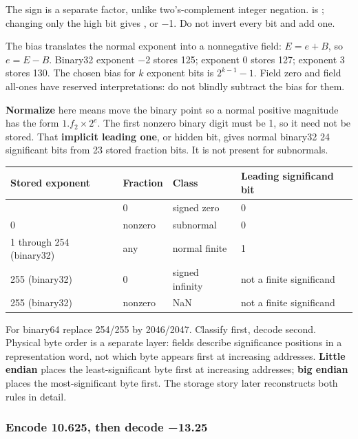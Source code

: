 The sign is a separate factor, unlike two's-complement integer negation.  is ; changing only the high bit gives , or −1. Do not invert every bit and add one.

The bias translates the normal exponent into a nonnegative field: \(E=e+B\), so \(e=E-B\). Binary32 exponent −2 stores 125; exponent 0 stores 127; exponent 3 stores 130. The chosen bias for \(k\) exponent bits is \(2^{k-1}-1\). Field zero and field all-ones have reserved interpretations: do not blindly subtract the bias for them.

\textbf{Normalize} here means move the binary point so a normal positive magnitude has the form \(1.f_2\times2^e\). The first nonzero binary digit must be 1, so it need not be stored. That \textbf{implicit leading one}, or hidden bit, gives normal binary32 24 significant bits from 23 stored fraction bits. It is not present for subnormals.

{\def\LTcaptype{none} %
\begin{longtable}[]{@{}llll@{}}
\toprule\noalign{}
Stored exponent & Fraction & Class & Leading significand bit \\
\midrule\noalign{}
\endhead
\bottomrule\noalign{}
\endlastfoot
0 & 0 & signed zero & 0 \\
0 & nonzero & subnormal & 0 \\
1 through 254 (binary32) & any & normal finite & 1 \\
255 (binary32) & 0 & signed infinity & not a finite significand \\
255 (binary32) & nonzero & NaN & not a finite significand \\
\end{longtable}
}

For binary64 replace 254/255 by 2046/2047. Classify first, decode second. Physical byte order is a separate layer: fields describe significance positions in a representation word, not which byte appears first at increasing addresses. \textbf{Little endian} places the least-significant byte first at increasing addresses; \textbf{big endian} places the most-significant byte first. The storage story later reconstructs both rules in detail.

\subsubsection{Encode 10.625, then decode −13.25}\label{01-foundations-i-ch001-encode-10.625-then-decode-13.25}

